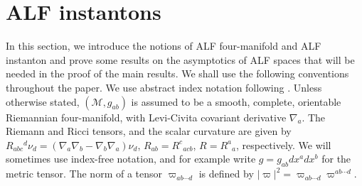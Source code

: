 \documentclass[a4paper,10pt,reqno]{amsart}
\newcommand{\cM}{\mathcal{M}}
\theoremstyle{plain}
\newcommand{\GenVec}{\nu}
\numberwithin{equation}{section}
\begin{document}
%
\section{ALF instantons} \label{sec:ALF-4mfd}
%

In this section, we introduce the notions of ALF four-manifold and ALF instanton and prove some results on the asymptotics of ALF spaces that will be needed in the proof of the main results. We shall use the following conventions throughout the paper. We use abstract index notation following \cite{PR:I}. Unless otherwise stated, $(\cM, g_{ab})$ is assumed to be a smooth, complete, orientable Riemannian four-manifold, with Levi-Civita covariant derivative $\nabla_a$. The Riemann and Ricci tensors, and the scalar curvature are given by $R_{abc}{}^d \GenVec_d = (\nabla_a \nabla_b - \nabla_b \nabla_a) \GenVec_d$, $R_{ab} = R^c{}_{acb}$, $R =R^a{}_a$, respectively. We will sometimes use index-free notation, and for example write $g = g_{ab} dx^a dx^b$ for the metric tensor. The norm of a tensor $\varpi_{ab \cdots d}$ is defined by $|\varpi|^2 = \varpi_{ab \cdots d} \varpi^{ab \cdots d}$.  
\end{document}
